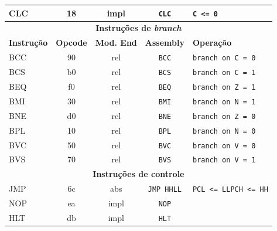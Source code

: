 \documentclass[
	12pt,				  %
	openright,		%
	a4paper,			%
	english,			%
	french,				%
	spanish,			%
	brazil,				%
]{abntex2}
\newcommand{\codenobg}[1]{\texttt{#1}}
\begin{document}
\begin{center}
\begin{longtable}{|l|c|c|c|p{7cm}|}
		\multirow{1}{*}{CLC} & 18              & impl              & \codenobg{CLC}         & \codenobg{C <= 0}                                \\ \hline
		\multicolumn{5}{|c|}{\textbf{Instruções de \emph{branch}}}                                                                             \\ \hline
		\textbf{Instrução}   & \textbf{Opcode} & \textbf{Mod. End} & \textbf{Assembly}      & \textbf{Operação}                                \\ \hline
		\multirow{1}{*}{BCC} & 90              & rel               & \codenobg{BCC}         & \codenobg{branch on C = 0}                       \\ \hline
		\multirow{1}{*}{BCS} & b0              & rel               & \codenobg{BCS}         & \codenobg{branch on C = 1}                       \\ \hline
		\multirow{1}{*}{BEQ} & f0              & rel               & \codenobg{BEQ}         & \codenobg{branch on Z = 1}                       \\ \hline
		\multirow{1}{*}{BMI} & 30              & rel               & \codenobg{BMI}         & \codenobg{branch on N = 1}                       \\ \hline
		\multirow{1}{*}{BNE} & d0              & rel               & \codenobg{BNE}         & \codenobg{branch on Z = 0}                       \\ \hline
		\multirow{1}{*}{BPL} & 10              & rel               & \codenobg{BPL}         & \codenobg{branch on N = 0}                       \\ \hline
		\multirow{1}{*}{BVC} & 50              & rel               & \codenobg{BVC}         & \codenobg{branch on V = 0}                       \\ \hline
		\multirow{1}{*}{BVS} & 70              & rel               & \codenobg{BVS}         & \codenobg{branch on V = 1}                       \\ \hline
		\multicolumn{5}{|c|}{\textbf{Instruções de controle}}                                                                                  \\ \hline
		\multirow{1}{*}{JMP} & 6c              & abs               & \codenobg{JMP HHLL}    & \codenobg{PCL <= LL}\newline\codenobg{PCH <= HH} \\ \hline
		\multirow{1}{*}{NOP} & ea              & impl              & \codenobg{NOP}         &                                                  \\ \hline
		\multirow{1}{*}{HLT} & db              & impl              & \codenobg{HLT}         &                                                  \\ \hline
	\end{longtable}
\end{center}
\end{document}
